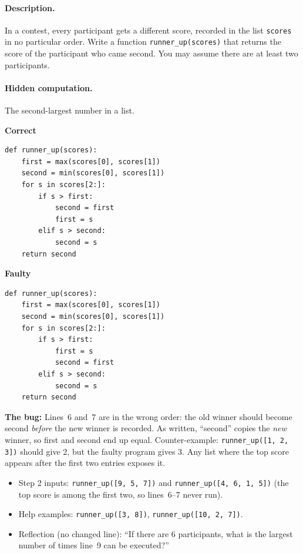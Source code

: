 \documentclass[11pt,a4paper]{article}
\newenvironment{codepair}{\par\noindent}{\par\medskip}
\newcommand{\codelabel}[1]{\textbf{\small #1}\par\vspace{2pt}}
\newcommand{\bugnote}[1]{\par\noindent\textcolor{bugred}{\textbf{The bug:}} #1\par\smallskip}
\begin{document}
\paragraph{Description.} In a contest, every participant gets a different
score, recorded in the list \texttt{scores} in no particular order. Write
a function \texttt{runner\_up(scores)} that returns the score of the
participant who came second. You may assume there are at least two
participants.

\paragraph{Hidden computation.} The second-largest number in a list.

\begin{codepair}
\begin{minipage}[t]{0.48\textwidth}
\codelabel{Correct}
\begin{lstlisting}
def runner_up(scores):
    first = max(scores[0], scores[1])
    second = min(scores[0], scores[1])
    for s in scores[2:]:
        if s > first:
            second = first
            first = s
        elif s > second:
            second = s
    return second
\end{lstlisting}
\end{minipage}\hfill
\begin{minipage}[t]{0.48\textwidth}
\codelabel{Faulty}
\begin{lstlisting}
def runner_up(scores):
    first = max(scores[0], scores[1])
    second = min(scores[0], scores[1])
    for s in scores[2:]:
        if s > first:
            first = s
            second = first
        elif s > second:
            second = s
    return second
\end{lstlisting}
\end{minipage}
\end{codepair}

\bugnote{Lines~6 and~7 are in the wrong order: the old winner should
become second \emph{before} the new winner is recorded. As written,
``second'' copies the \emph{new} winner, so first and second end up
equal. Counter-example: \texttt{runner\_up([1, 2, 3])} should give 2, but
the faulty program gives 3. Any list where the top score appears after
the first two entries exposes it.}

\begin{itemize}[nosep]
  \item Step 2 inputs: \texttt{runner\_up([9, 5, 7])} and
        \texttt{runner\_up([4, 6, 1, 5])} (the top score is among the
        first two, so lines~6--7 never run).
  \item Help examples: \texttt{runner\_up([3, 8])},
        \texttt{runner\_up([10, 2, 7])}.
  \item Reflection (no changed line): ``If there are 6 participants, what
        is the largest number of times line~9 can be executed?''
\end{itemize}
\end{document}
